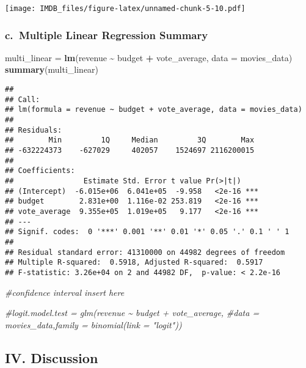 \documentclass[
]{article}
\newenvironment{Shaded}{\begin{snugshade}}{\end{snugshade}}
\newcommand{\AttributeTok}[1]{\textcolor[rgb]{0.13,0.29,0.53}{#1}}
\newcommand{\CommentTok}[1]{\textcolor[rgb]{0.56,0.35,0.01}{\textit{#1}}}
\newcommand{\FunctionTok}[1]{\textcolor[rgb]{0.13,0.29,0.53}{\textbf{#1}}}
\newcommand{\NormalTok}[1]{#1}
\newcommand{\OtherTok}[1]{\textcolor[rgb]{0.56,0.35,0.01}{#1}}
\newcommand{\SpecialCharTok}[1]{\textcolor[rgb]{0.81,0.36,0.00}{\textbf{#1}}}
\begin{document}
\texttt{[image: IMDB\_files/figure-latex/unnamed-chunk-5-10.pdf]}

\hypertarget{c.-multiple-linear-regression-summary}{%
\subsubsection{c.~Multiple Linear Regression
Summary}\label{c.-multiple-linear-regression-summary}}

\begin{Shaded}
\begin{Highlighting}[]
\NormalTok{multi\_linear }\OtherTok{=} \FunctionTok{lm}\NormalTok{(revenue }\SpecialCharTok{\textasciitilde{}}\NormalTok{ budget }\SpecialCharTok{+}\NormalTok{ vote\_average, }\AttributeTok{data =}\NormalTok{ movies\_data)}
\FunctionTok{summary}\NormalTok{(multi\_linear)}
\end{Highlighting}
\end{Shaded}

\begin{verbatim}
## 
## Call:
## lm(formula = revenue ~ budget + vote_average, data = movies_data)
## 
## Residuals:
##        Min         1Q     Median         3Q        Max 
## -632224373    -627029     402057    1524697 2116200015 
## 
## Coefficients:
##                Estimate Std. Error t value Pr(>|t|)    
## (Intercept)  -6.015e+06  6.041e+05  -9.958   <2e-16 ***
## budget        2.831e+00  1.116e-02 253.819   <2e-16 ***
## vote_average  9.355e+05  1.019e+05   9.177   <2e-16 ***
## ---
## Signif. codes:  0 '***' 0.001 '**' 0.01 '*' 0.05 '.' 0.1 ' ' 1
## 
## Residual standard error: 41310000 on 44982 degrees of freedom
## Multiple R-squared:  0.5918, Adjusted R-squared:  0.5917 
## F-statistic: 3.26e+04 on 2 and 44982 DF,  p-value: < 2.2e-16
\end{verbatim}

\begin{Shaded}
\begin{Highlighting}[]
\CommentTok{\#confidence interval insert here }
\end{Highlighting}
\end{Shaded}

\begin{Shaded}
\begin{Highlighting}[]
\CommentTok{\#logit.model.test = glm(revenue \textasciitilde{} budget + vote\_average, }
                       \CommentTok{\#data = movies\_data,family = binomial(link = "logit"))}
\end{Highlighting}
\end{Shaded}

\hypertarget{iv.-discussion}{%
\subsection{IV. Discussion}\label{iv.-discussion}}
\end{document}
